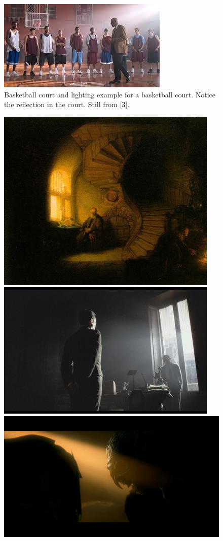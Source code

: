 \documentclass[12pt,a4paper]{article}
\begin{document}
\begin{figure}
\center
\includegraphics[scale=1]{images/carter.jpeg} 
\caption{Basketball court and lighting example for a basketball court. Notice the reflection in the court. Still from [3].}
\label{img_carter}
\end{figure}

\begin{figure}
\center
\begin{minipage}{\textwidth}
\includegraphics[scale=2 ]{images/chiaro_1.jpg} 
\includegraphics[scale=0.4 ]{images/chiaro_2.jpg} 
\includegraphics[scale=0.1 ]{images/chiaro_3.jpg} 

\end{minipage}
\end{figure}
\end{document}
